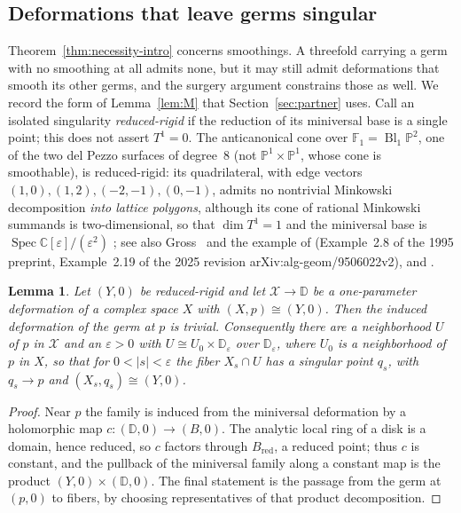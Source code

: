 \documentclass[11pt]{amsart}
\newtheorem{lemma}[theorem]{Lemma}
\theoremstyle{definition}
\theoremstyle{remark}
\theoremstyle{plain}
\newcommand{\CC}{\mathbb{C}}
\newcommand{\PP}{\mathbb{P}}
\newcommand{\cX}{\mathcal{X}}
\newcommand{\Bl}{\operatorname{Bl}}
\newcommand{\Disk}{\mathbb{D}}
\begin{document}
\subsection{Deformations that leave germs singular}\label{sec:partialmem}
Theorem~\ref{thm:necessity-intro} concerns smoothings.  A threefold carrying a
germ with no smoothing at all admits none, but it may still admit
deformations that smooth its other germs, and the surgery argument
constrains those as well.  We record the form of Lemma~\ref{lem:M}
that Section~\ref{sec:partner} uses.  Call an isolated singularity
\emph{reduced-rigid} if the reduction of its miniversal base is a
single point; this does not assert $T^1=0$.  The anticanonical cone
over $\mathbb F_1=\Bl_1\PP^2$, one of the two del Pezzo surfaces of
degree~$8$ (not $\PP^1\times\PP^1$, whose cone is smoothable), is
reduced-rigid: its quadrilateral, with edge vectors
$(1,0),(1,2),(-2,-1),(0,-1)$, admits no nontrivial Minkowski
decomposition \emph{into lattice polygons}, although its cone of
rational Minkowski summands is two-dimensional, so that $\dim T^1=1$
and the miniversal base is
$\operatorname{Spec}\CC[\varepsilon]/(\varepsilon^2)$
\cite[(9.1)(iv),\,(9.2)]{Altmann97}; see also
Gross~\cite[\S5.5]{Gross97} and the example of \cite[\S2]{Gross97} (Example~2.8
of the 1995 preprint, Example~2.19 of the 2025 revision
arXiv:alg-geom/9506022v2), and \cite{PaperI}.

\begin{lemma}\label{lem:rigid}
Let $(Y,0)$ be reduced-rigid and let $\cX\to\Disk$ be a
one-parameter deformation of a complex space $X$ with
$(X,p)\cong(Y,0)$.  Then the induced deformation of the germ at $p$ is
trivial.  Consequently there are a neighborhood $U$ of $p$ in $\cX$
and an $\varepsilon>0$ with $U\cong U_0\times\Disk_\varepsilon$ over
$\Disk_\varepsilon$, where $U_0$ is a neighborhood of $p$ in $X$, so that for $0<|s|<\varepsilon$ the fiber
$X_s\cap U$ has a singular point $q_s$, with $q_s\to p$ and
$(X_s,q_s)\cong(Y,0)$.
\end{lemma}

\begin{proof}
Near $p$ the family is induced from the miniversal deformation by a
holomorphic map $c\colon(\Disk,0)\to(B,0)$.  The analytic local ring
of a disk is a domain, hence reduced, so $c$ factors through
$B_{\mathrm{red}}$, a reduced point; thus $c$ is constant, and the
pullback of the miniversal family along a constant map is the product
$(Y,0)\times(\Disk,0)$.  The final statement is the passage from the
germ at $(p,0)$ to fibers, by choosing representatives of that
product decomposition.
\end{proof}
\end{document}
